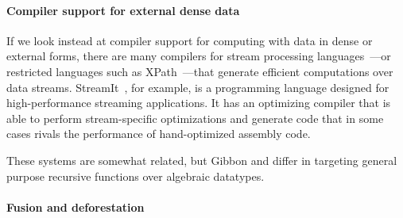 \paragraph{Compiler support for external dense data}

If we look instead at compiler support for computing with data in dense or
external forms, there are many compilers for stream processing
languages~\cite{streamit,wavescript-nsdi}---or restricted languages such as
XPath~\cite{xpath-streams}---that generate efficient computations over data
streams.
%
StreamIt~\cite{streamit}, for example, is a programming language designed for
high-performance streaming applications. It has an optimizing compiler that is
able to perform stream-specific optimizations and generate code that in some
cases rivals the performance of hand-optimized assembly code.

These systems are somewhat related, but Gibbon and \ourcalc{} differ in
targeting general purpose recursive functions over algebraic datatypes.


%

\paragraph{Fusion and deforestation}

